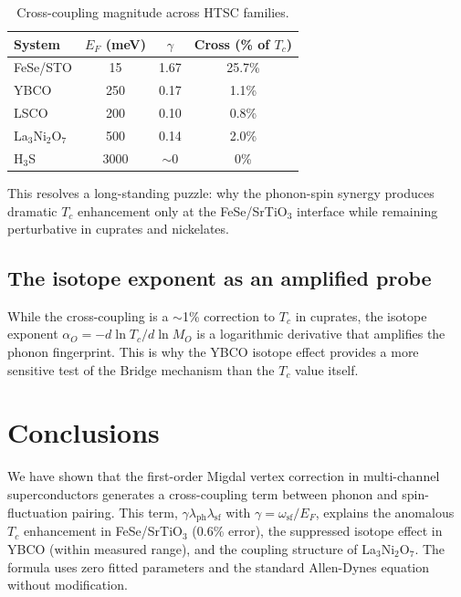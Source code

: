\documentclass[twocolumn,showpacs,preprintnumbers,amsmath,amssymb,prb]{revtex4-2}
\begin{document}
\begin{table}[h]
\caption{Cross-coupling magnitude across HTSC families.}
\begin{ruledtabular}
\begin{tabular}{lccc}
System & $E_F$ (meV) & $\gamma$ & Cross (\% of $T_c$) \\
\hline
FeSe/STO & 15 & 1.67 & 25.7\% \\
YBCO & 250 & 0.17 & 1.1\% \\
LSCO & 200 & 0.10 & 0.8\% \\
La$_3$Ni$_2$O$_7$ & 500 & 0.14 & 2.0\% \\
H$_3$S & 3000 & $\sim$0 & 0\% \\
\end{tabular}
\end{ruledtabular}
\label{tab:universality}
\end{table}

This resolves a long-standing puzzle: why the phonon-spin synergy produces dramatic $T_c$ enhancement only at the FeSe/SrTiO$_3$ interface while remaining perturbative in cuprates and nickelates.

\subsection{The isotope exponent as an amplified probe}

While the cross-coupling is a $\sim$1\% correction to $T_c$ in cuprates, the isotope exponent $\alpha_O = -d\ln T_c / d\ln M_O$ is a logarithmic derivative that amplifies the phonon fingerprint.
This is why the YBCO isotope effect provides a more sensitive test of the Bridge mechanism than the $T_c$ value itself.

\section{Conclusions}

We have shown that the first-order Migdal vertex correction in multi-channel superconductors generates a cross-coupling term between phonon and spin-fluctuation pairing.
This term, $\gamma \lambda_{\mathrm{ph}} \lambda_{\mathrm{sf}}$ with $\gamma = \omega_{\mathrm{sf}}/E_F$, explains the anomalous $T_c$ enhancement in FeSe/SrTiO$_3$ (0.6\% error), the suppressed isotope effect in YBCO (within measured range), and the coupling structure of La$_3$Ni$_2$O$_7$.
The formula uses zero fitted parameters and the standard Allen-Dynes equation without modification.
\end{document}
